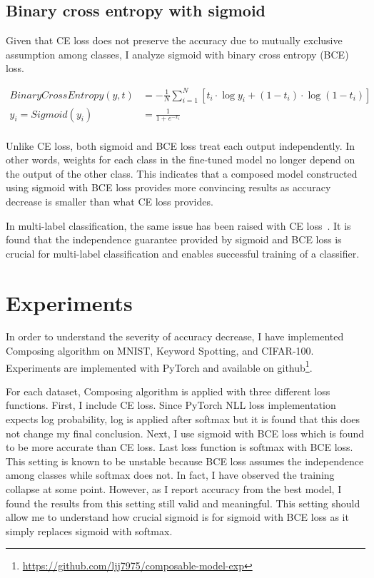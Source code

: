 \documentclass{article}
\begin{document}
\subsection{Binary cross entropy with sigmoid}

Given that CE loss does not preserve the accuracy due to mutually exclusive assumption among classes, I analyze sigmoid with binary cross entropy (BCE) loss.

\begin{align*}
BinaryCrossEntropy(y, t) & = -\frac{1}{N}\sum_{i=1}^N \left[ t_i \cdot \log y_i + (1 - t_i) \cdot \log (1 - t_i) \right] \\
y_i = Sigmoid(y_i) &= \frac{1}{1 + e^{-x_i}} \\
\end{align*}

Unlike CE loss, both sigmoid and BCE loss treat each output independently. In other words, weights for each class in the fine-tuned model no longer depend on the output of the other class. This indicates that a composed model constructed using sigmoid with BCE loss provides more convincing results as accuracy decrease is smaller than what CE loss provides.

In multi-label classification, the same issue has been raised with CE loss~\cite{liu2017deep}. It is found that the independence guarantee provided by sigmoid and BCE loss is crucial for multi-label classification and enables successful training of a classifier.

\section{Experiments}

In order to understand the severity of accuracy decrease, I have implemented Composing algorithm on MNIST, Keyword Spotting, and CIFAR-100. Experiments are implemented with PyTorch and available on github\footnote{\url{https://github.com/ljj7975/composable-model-exp}}.

For each dataset, Composing algorithm is applied with three different loss functions. First, I include CE loss. Since PyTorch NLL loss implementation expects log probability, log is applied after softmax but it is found that this does not change my final conclusion. Next, I use sigmoid with BCE loss which is found to be more accurate than CE loss. Last loss function is softmax with BCE loss. This setting is known to be unstable because BCE loss assumes the independence among classes while softmax does not. In fact, I have observed the training collapse at some point. However, as I report accuracy from the best model, I found the results from this setting still valid and meaningful. This setting should allow me to understand how crucial sigmoid is for sigmoid with BCE loss as it simply replaces sigmoid with softmax.
\end{document}
